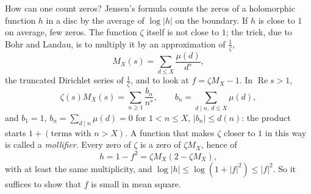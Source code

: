 How can one count zeros? Jensen's formula counts the zeros of a holomorphic function $h$ in a disc by the average of $\log|h|$ on the boundary. If $h$ is close to $1$ on average, few zeros. The function $\zeta$ itself is not close to $1$; the trick, due to Bohr and Landau, is to multiply it by an approximation of $\frac1\zeta$,
\[
M_X(s)=\sum_{d\le X}\frac{\mu(d)}{d^s},
\]
the truncated Dirichlet series of $\frac1\zeta$, and to look at $f=\zeta M_X-1$. In $\operatorname{Re}s>1$,
\[
\zeta(s)M_X(s)=\sum_{n\ge1}\frac{b_n}{n^s},\qquad b_n=\sum_{d\mid n,\ d\le X}\mu(d),
\]
and $b_1=1$, $b_n=\sum_{d\mid n}\mu(d)=0$ for $1<n\le X$, $|b_n|\le d(n)$: the product starts $1+(\text{terms with }n>X)$. A function that makes $\zeta$ closer to $1$ in this way is called a \emph{mollifier}. Every zero of $\zeta$ is a zero of $\zeta M_X$, hence of
\[
h=1-f^2=\zeta M_X(2-\zeta M_X),
\]
with at least the same multiplicity, and $\log|h|\le\log(1+|f|^2)\le|f|^2$. So it suffices to show that $f$ is small in mean square.

